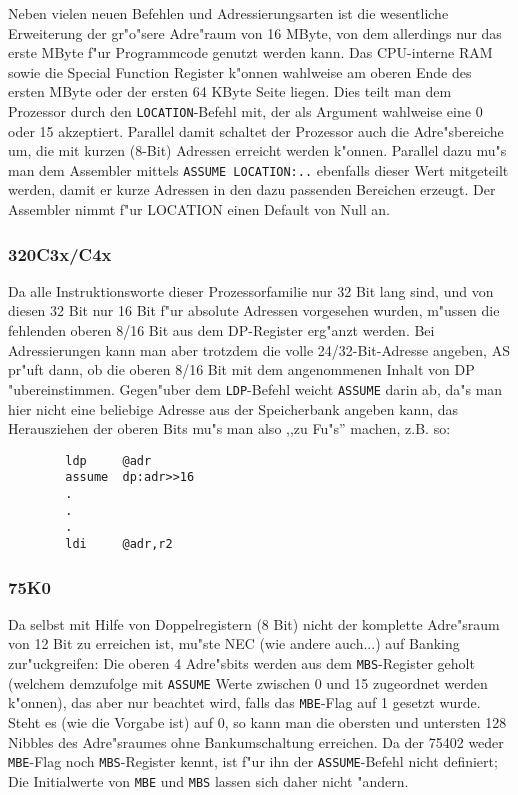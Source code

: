\documentclass[12pt,a4paper,twoside]{report}
\newcommand{\tty}[1]{{\tt #1}}
\begin{document}
Neben vielen neuen Befehlen und Adressierungsarten ist die
wesentliche Erweiterung der gr"o"sere Adre"raum von 16 MByte, von
dem allerdings nur das erste MByte f"ur Programmcode genutzt
werden kann.  Das CPU-interne RAM sowie die Special Function
Register k"onnen wahlweise am oberen Ende des ersten MByte oder
der ersten 64 KByte Seite liegen.  Dies teilt man dem Prozessor
durch den \tty{LOCATION}-Befehl mit, der als Argument wahlweise
eine 0 oder 15 akzeptiert.  Parallel damit schaltet der Prozessor
auch die Adre"sbereiche um, die mit kurzen (8-Bit) Adressen
erreicht werden k"onnen.  Parallel dazu mu"s man dem Assembler
mittels \tty{ASSUME LOCATION:..} ebenfalls dieser Wert mitgeteilt
werden, damit er kurze Adressen in den dazu passenden Bereichen
erzeugt.  Der Assembler nimmt f"ur LOCATION einen Default von Null
an.


\subsubsection{320C3x/C4x}

Da alle Instruktionsworte dieser Prozessorfamilie nur 32 Bit lang
sind, und von diesen 32 Bit nur 16 Bit f"ur absolute Adressen vorgesehen
wurden, m"ussen die fehlenden oberen 8/16 Bit aus dem DP-Register
erg"anzt werden.  Bei Adressierungen kann man aber trotzdem die volle
24/32-Bit-Adresse angeben, AS pr"uft dann, ob die oberen 8/16 Bit mit dem
angenommenen Inhalt von DP "ubereinstimmen.  Gegen"uber dem \tty{LDP}-Befehl
weicht \tty{ASSUME} darin ab, da"s man hier nicht eine beliebige Adresse
aus der Speicherbank angeben kann, das Herausziehen der oberen Bits
mu"s man also ,,zu Fu"s'' machen, z.B. so:
\begin{verbatim}
        ldp     @adr
        assume  dp:adr>>16
        .
        .
        .
        ldi     @adr,r2
\end{verbatim}


\subsubsection{75K0}

Da selbst mit Hilfe von Doppelregistern (8 Bit) nicht der komplette
Adre"sraum von 12 Bit zu erreichen ist, mu"ste NEC (wie andere auch...)
auf Banking zur"uckgreifen: Die oberen 4 Adre"sbits werden aus dem
\tty{MBS}-Register geholt (welchem demzufolge mit \tty{ASSUME} Werte
zwischen 0 und 15 zugeordnet werden k"onnen), das aber nur beachtet
wird, falls das \tty{MBE}-Flag auf 1 gesetzt wurde.  Steht es (wie
die Vorgabe ist) auf 0, so kann man die obersten und untersten 128
Nibbles des Adre"sraumes ohne Bankumschaltung erreichen.  Da der 75402
weder \tty{MBE}-Flag noch \tty{MBS}-Register kennt, ist f"ur ihn der
\tty{ASSUME}-Befehl nicht definiert; Die Initialwerte von \tty{MBE} und
\tty{MBS} lassen sich daher nicht "andern.
\end{document}

